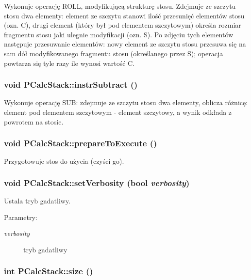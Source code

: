Wykonuje operację ROLL, modyfikującą strukturę stosu. Zdejmuje ze szczytu stosu dwa elementy: element ze szczytu stanowi ilość przesunięć elementów stosu (ozn. C), drugi element (który był pod elementem szczytowym) określa rozmiar fragmentu stosu jaki ulegnie modyfikacji (ozn. S). Po zdjęciu tych elementów następuje przesuwanie elementów: nowy element ze szczytu stosu przesuwa się na sam dół modyfikowanego fragmentu stosu (określanego przez S); operacja powtarza się tyle razy ile wynosi wartość C. \hypertarget{classPCalcStack_a35493e8dc971fc2f47a113a6d400784}{
\subsubsection[{instrSubtract}]{\setlength{\rightskip}{0pt plus 5cm}void PCalcStack::instrSubtract ()}}
\label{classPCalcStack_a35493e8dc971fc2f47a113a6d400784}


Wykonuje operację SUB: zdejmuje ze szczytu stosu dwa elementy, oblicza różnicę: element pod elementem szczytowym - element szczytowy, a wynik odkłada z powrotem na stosie. \hypertarget{classPCalcStack_b3129921fea95a4df231201e2601e1c0}{
\subsubsection[{prepareToExecute}]{\setlength{\rightskip}{0pt plus 5cm}void PCalcStack::prepareToExecute ()}}
\label{classPCalcStack_b3129921fea95a4df231201e2601e1c0}


Przygotowuje stos do użycia (czyści go). \hypertarget{classPCalcStack_6a831a20f4dec457de9f880202cf2e33}{
\subsubsection[{setVerbosity}]{\setlength{\rightskip}{0pt plus 5cm}void PCalcStack::setVerbosity (bool {\em verbosity})}}
\label{classPCalcStack_6a831a20f4dec457de9f880202cf2e33}


Ustala tryb gadatliwy. \begin{Desc}
\item[Parametry:]
\begin{description}
\item[{\em verbosity}]tryb gadatliwy \end{description}
\end{Desc}
\hypertarget{classPCalcStack_e334a37c1749b028e75e0d251afe47f7}{
\subsubsection[{size}]{\setlength{\rightskip}{0pt plus 5cm}int PCalcStack::size ()}}
\label{classPCalcStack_e334a37c1749b028e75e0d251afe47f7}


